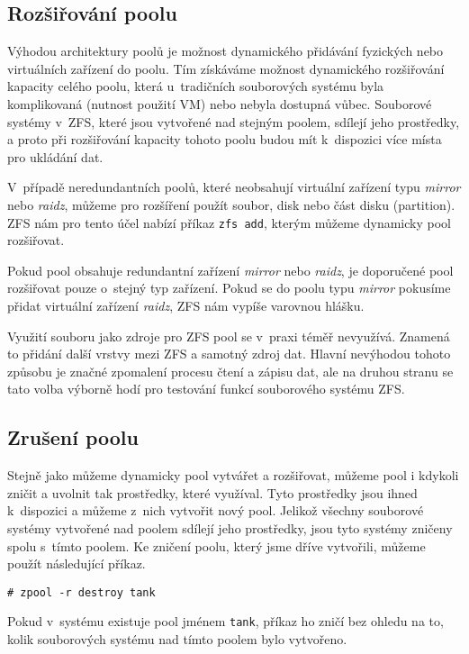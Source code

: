 \subsection{Rozšiřování poolu}
Výhodou architektury poolů je možnost dynamického přidávání fyzických nebo virtuálních zařízení do poolu. Tím získáváme možnost dynamického rozšiřování kapacity celého poolu, která u~tradičních souborových systému byla komplikovaná (nutnost použití VM) nebo nebyla dostupná vůbec. Souborové systémy v~ZFS, které jsou vytvořené nad stejným poolem, sdílejí jeho prostředky, a proto při rozšiřování kapacity tohoto poolu budou mít k~dispozici více místa pro ukládání dat.

V~případě neredundantních poolů, které neobsahují virtuální zařízení typu \emph{mirror} nebo \emph{raidz}, můžeme pro rozšíření použít soubor, disk nebo část disku (partition). ZFS nám pro tento účel nabízí příkaz \verb|zfs add|, kterým můžeme dynamicky pool rozšiřovat.

Pokud pool obsahuje redundantní zařízení \emph{mirror} nebo \emph{raidz}, je doporučené pool rozšiřovat pouze o~stejný typ zařízení. Pokud se do poolu typu \emph{mirror} pokusíme přidat virtuální zařízení \emph{raidz}, ZFS nám vypíše varovnou hlášku.

Využití souboru jako zdroje pro ZFS pool se v~praxi téměř nevyužívá. Znamená to přidání další vrstvy mezi ZFS a samotný zdroj dat. Hlavní nevýhodou tohoto způsobu je značné zpomalení procesu čtení a zápisu dat, ale na druhou stranu se tato volba výborně hodí pro testování funkcí souborového systému ZFS.

\subsection{Zrušení poolu}
Stejně jako můžeme dynamicky pool vytvářet a rozšiřovat, můžeme pool i kdykoli zničit a uvolnit tak prostředky, které využíval. Tyto prostředky jsou ihned k~dispozici a můžeme z~nich vytvořit nový pool. Jelikož všechny souborové systémy vytvořené nad poolem sdílejí jeho prostředky, jsou tyto systémy zničeny spolu s~tímto poolem. Ke zničení poolu, který jsme dříve vytvořili, můžeme použít následující příkaz.
\begin{verbatim}
# zpool -r destroy tank
\end{verbatim}
Pokud v~systému existuje pool jménem \verb|tank|, příkaz ho zničí bez ohledu na to, kolik souborových systému nad tímto poolem bylo vytvořeno.

